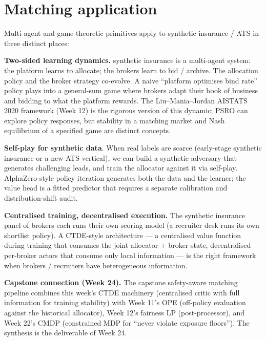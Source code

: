 \documentclass[11pt,oneside]{scrbook}
\begin{document}
\chapter{Matching application}

\begin{matching}
Multi-agent and game-theoretic primitives apply to synthetic insurance / ATS in three
distinct places:

\textbf{Two-sided learning dynamics.} synthetic insurance is a multi-agent system: the
platform learns to allocate; the brokers learn to bid / archive. The
allocation policy and the broker strategy co-evolve. A naive ``platform
optimises bind rate'' policy plays into a general-sum game where brokers
adapt their book of business and bidding to what the platform rewards.
The Liu--Mania--Jordan AISTATS 2020 framework (Week 12) is the rigorous
version of this dynamic; PSRO can explore policy responses, but stability in a matching
market and Nash equilibrium of a specified game are distinct concepts.

\textbf{Self-play for synthetic data}. When real labels are scarce
(early-stage synthetic insurance or a new ATS vertical), we can build a synthetic
adversary that generates challenging leads, and train the allocator
against it via self-play. AlphaZero-style policy iteration generates
both the data and the learner; the value head is a fitted predictor that requires a separate
calibration and distribution-shift audit.

\textbf{Centralised training, decentralised execution.} The synthetic insurance panel
of brokers each runs their own scoring model (a recruiter desk runs its
own shortlist policy). A CTDE-style architecture --- a centralised value
function during training that consumes the joint allocator + broker
state, decentralised per-broker actors that consume only local
information --- is the right framework when brokers / recruiters have
heterogeneous information.

\textbf{Capstone connection (Week 24).} The capstone safety-aware
matching pipeline combines this week's CTDE machinery (centralised
critic with full information for training stability) with Week 11's OPE
(off-policy evaluation against the historical allocator), Week 12's
fairness LP (post-processor), and Week 22's CMDP (constrained MDP for
``never violate exposure floors''). The synthesis is the deliverable
of Week 24.
\end{matching}
\end{document}
